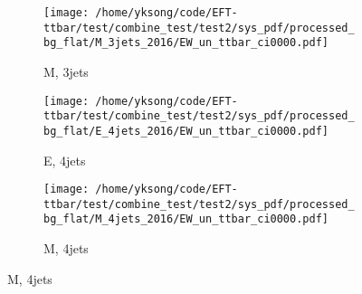 \documentclass{beamer}
\begin{document}
\begin{frame}
\begin{figure}
\begin{subfigure}[b]{0.24\textwidth}
\texttt{[image: /home/yksong/code/EFT-ttbar/test/combine\_test/test2/sys\_pdf/processed\_bg\_flat/M\_3jets\_2016/EW\_un\_ttbar\_ci0000.pdf]}
\captionsetup{font=tiny}
\caption{M, 3jets}
\end{subfigure}
\begin{subfigure}[b]{0.24\textwidth}
\texttt{[image: /home/yksong/code/EFT-ttbar/test/combine\_test/test2/sys\_pdf/processed\_bg\_flat/E\_4jets\_2016/EW\_un\_ttbar\_ci0000.pdf]}
\captionsetup{font=tiny}
\caption{E, 4jets}
\end{subfigure}
\begin{subfigure}[b]{0.24\textwidth}
\texttt{[image: /home/yksong/code/EFT-ttbar/test/combine\_test/test2/sys\_pdf/processed\_bg\_flat/M\_4jets\_2016/EW\_un\_ttbar\_ci0000.pdf]}
\captionsetup{font=tiny}
\caption{M, 4jets}
\end{subfigure}
\end{figure}
\end{frame}
\end{document}
